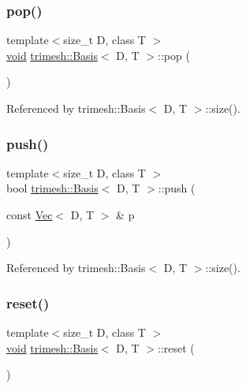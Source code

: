 \subsubsection{\texorpdfstring{pop()}{pop()}}
{\footnotesize\ttfamily template$<$size\+\_\+t D, class T $>$ \\
\hyperlink{namespacetrimesh_a784ddfd979e1c579bda795a8edfc3f43}{void} \hyperlink{classtrimesh_1_1Basis}{trimesh\+::\+Basis}$<$ D, T $>$\+::pop (\begin{DoxyParamCaption}{ }\end{DoxyParamCaption})}



Referenced by trimesh\+::\+Basis$<$ D, T $>$\+::size().

\mbox{\label{classtrimesh_1_1Basis_a9dfc260252428e3b2bf890a92412b7fd}} 
\subsubsection{\texorpdfstring{push()}{push()}}
{\footnotesize\ttfamily template$<$size\+\_\+t D, class T $>$ \\
bool \hyperlink{classtrimesh_1_1Basis}{trimesh\+::\+Basis}$<$ D, T $>$\+::push (\begin{DoxyParamCaption}\item[{const \hyperlink{classtrimesh_1_1Vec}{Vec}$<$ D, T $>$ \&}]{p }\end{DoxyParamCaption})}



Referenced by trimesh\+::\+Basis$<$ D, T $>$\+::size().

\mbox{\label{classtrimesh_1_1Basis_ab90120bbba4505a92d39258454a63dfa}} 
\subsubsection{\texorpdfstring{reset()}{reset()}}
{\footnotesize\ttfamily template$<$size\+\_\+t D, class T $>$ \\
\hyperlink{namespacetrimesh_a784ddfd979e1c579bda795a8edfc3f43}{void} \hyperlink{classtrimesh_1_1Basis}{trimesh\+::\+Basis}$<$ D, T $>$\+::reset (\begin{DoxyParamCaption}{ }\end{DoxyParamCaption})}



